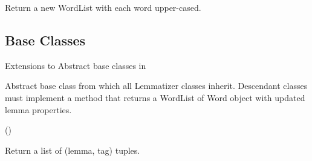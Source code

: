 \documentclass[letterpaper,10pt,english]{sphinxmanual}
\begin{document}
\begin{fulllineitems}
\begin{fulllineitems}
\end{fulllineitems}


\begin{fulllineitems}
\label{api_reference:textblob_de.blob.WordList.sort}
\end{fulllineitems}


\begin{fulllineitems}
\label{api_reference:textblob_de.blob.WordList.upper}
Return a new WordList with each word upper-cased.

\end{fulllineitems}


\end{fulllineitems}



\subsection{Base Classes}
\label{api_reference:api-base-classes}\label{api_reference:module-textblob_de.base}\label{api_reference:base-classes}
Extensions to Abstract base classes in 

\begin{fulllineitems}
\label{api_reference:textblob_de.base.BaseLemmatizer}
Abstract base class from which all Lemmatizer classes inherit.
Descendant classes must implement a  method that returns
a WordList of Word object with updated lemma properties.

()

\begin{fulllineitems}
\label{api_reference:textblob_de.base.BaseLemmatizer.lemmatize}
Return a list of (lemma, tag) tuples.

\end{fulllineitems}


\end{fulllineitems}
\end{document}
